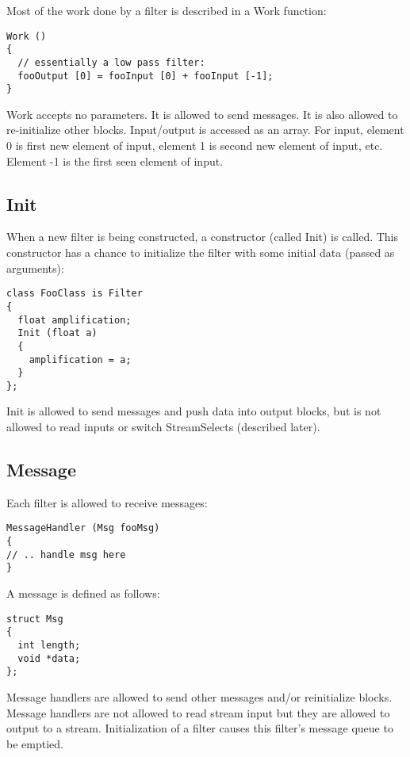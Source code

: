 \documentclass[twocolumn, draft]{article}
\begin{document}
Most of the work done by a filter is described in a Work function:

\begin{verbatim}
Work ()
{
  // essentially a low pass filter:
  fooOutput [0] = fooInput [0] + fooInput [-1];
}
\end{verbatim}

Work accepts no parameters.  It is allowed to send messages.  It is also
allowed to re-initialize other blocks.
Input/output
is accessed as an array.  For input, element 0 is first new element of input,
element 1 is second new element of input, etc.  Element -1 is the first seen
element of input.

\subsection{Init}

When a new filter is being constructed, a constructor (called Init) is called.
This constructor has a chance to initialize the filter with some initial
data (passed as arguments):

\begin{verbatim}
class FooClass is Filter
{
  float amplification;
  Init (float a)
  {
    amplification = a;
  }
};
\end{verbatim}

Init is allowed to send messages and push data into output blocks,
but is not allowed to read inputs or switch StreamSelects (described later).

\subsection{Message}

Each filter is allowed to receive messages:

\begin{verbatim}
MessageHandler (Msg fooMsg)
{
// .. handle msg here
}
\end{verbatim}

A message is defined as follows:

\begin{verbatim}
struct Msg
{
  int length;
  void *data;
};
\end{verbatim}

Message handlers are allowed to send other messages and/or reinitialize blocks.
Message handlers are not allowed to read stream input but they are allowed
to output to a stream.
Initialization of a filter causes this filter's message queue to be emptied.
\end{document}
